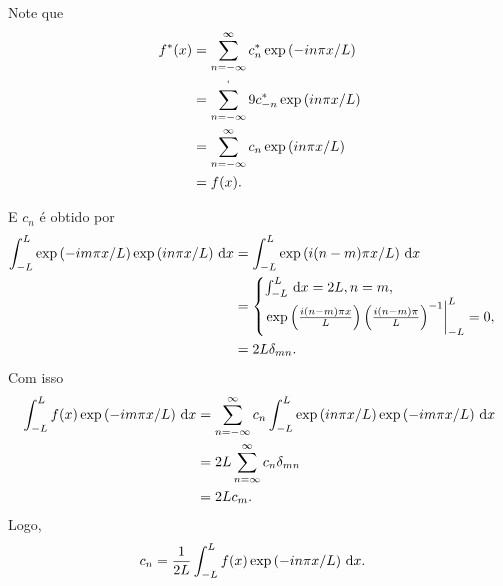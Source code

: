 \begin{obs}
    Note que
    \begin{align*}
        f^*(x) &= \sum_{n = -\infty}^\infty c_n^* \exp\left( -i n \pi x / L \right) \\
        &= \sum_{n = -\infty}^`9 c_{-n}^* \exp\left( i n \pi x / L \right) \\
        &= \sum_{n = -\infty}^\infty c_n \exp\left( i n \pi x / L \right) \\
        &= f(x).
    \end{align*}
\end{obs}

E $c_n$ \'{e} obtido por
\begin{align*}
    \int_{-L}^L \exp\left( -i m \pi x / L \right) \exp\left( i n \pi x / L \right) \, \mathrm{d}x &= \int_{-L}^L \exp\left( i (n - m) \pi x / L \right) \, \mathrm{d}x \\
    &= \begin{cases}
        \int_{-L}^L \, \mathrm{d}x = 2 L, n = m, \\
        \left. \exp\left( \frac{i (n - m) \pi x}{L} \right) \left( \frac{i (n - m) \pi}{L} \right)^{-1} \right|_{-L}^L = 0,
    \end{cases} \\
    &= 2 L \delta_{mn}.
\end{align*}
Com isso
\begin{align*}
    \int_{-L}^L f(x) \exp\left( -i m \pi x / L \right) \, \mathrm{d}x &= \sum_{n = -\infty}^\infty c_n \int_{-L}^L \exp\left( i n \pi x / L \right) \exp\left( -i m \pi x / L \right) \, \mathrm{d}x \\
    &= 2 L \sum_{n = \infty}^\infty c_n \delta_{mn} \\
    &= 2 L c_m.
\end{align*}
Logo,
\begin{align*}
    c_n &= \frac{1}{2L} \int_{-L}^L f(x) \exp\left( -i n \pi x / L \right) \, \mathrm{d}x.
\end{align*}

